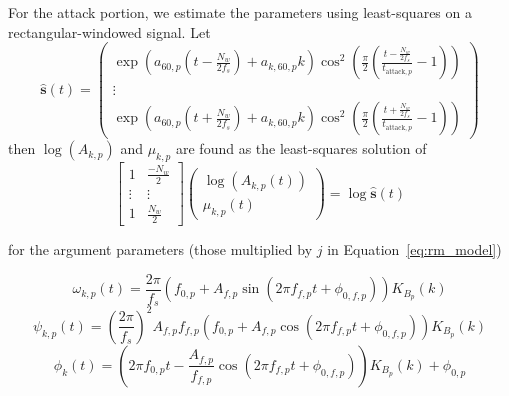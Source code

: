 For the attack portion, we estimate the parameters using least-squares on a
rectangular-windowed signal. Let
\begin{equation}
    \hat{\mathbf{s}}(t) =
    \begin{pmatrix}
        \exp \left(\displaystyle a_{60,p} \left( t - \frac{N_{w}}{2f_{s}} \right)  +
        a_{k,60,p} k \right) \cos^{2} \left(\displaystyle \frac{\pi}{2} \left(
                \frac{ t
        - \frac{N_{w}}{2f_{s}} }{ t_{\text{attack},p}} - 1 \right) \right)  \\
        \vdots \\
        \exp \left(\displaystyle a_{60,p} \left( t + \frac{N_{w}}{2f_{s}} \right)  +
        a_{k,60,p} k \right) \cos^{2} \left(\displaystyle \frac{\pi}{2} \left(
                \frac{ t
        + \frac{N_{w}}{2f_{s}}  }{ t_{\text{attack},p}} - 1 \right) \right)
    \end{pmatrix}
\end{equation}
then $\log(A_{k,p})$ and $\mu_{k,p}$ are found as the least-squares solution of
\begin{equation}
    \begin{bmatrix}
        1 & \frac{-N_{w}}{2} \\
        \vdots & \vdots \\
        1 & \frac{N_{w}}{2}
    \end{bmatrix}
    \begin{pmatrix}
        \log(A_{k,p}(t)) \\
        \mu_{k,p}(t)
    \end{pmatrix}
    = \log{\hat{\mathbf{s}}(t)}
\end{equation}

for the argument parameters (those multiplied by $j$ in Equation~\eqref{eq:rm_model})

\begin{equation}
    \omega_{k,p} \left( t \right)  = \frac{2 \pi}{f_{s}}  \left(  f_{0,p} +
    A_{f,p} \sin \left( 2 \pi f_{f,p} t + \phi_{0,f,p} \right)  \right)
    K_{B_{p}} \left( k \right) 
\end{equation}
\begin{equation}
    \psi_{k,p} \left( t \right)  =  \left( \frac{2 \pi}{f_{s}} \right) ^{2}
    A_{f,p} f_{f,p}  \left(  f_{0,p} + A_{f,p} \cos \left( 2 \pi f_{f,p} t +
    \phi_{0,f,p} \right)  \right)  K_{B_{p}} \left( k \right) 
\end{equation}
\begin{equation}
    \phi_{k} \left( t \right)  =  \left( 2\pi f_{0,p}t - \frac{A_{f,p}}{f_{f,p}}
    \cos \left( 2\pi f_{f,p} t + \phi_{0,f,p} \right)  \right)  K_{B_{p}} \left(
    k \right)  + \phi_{0,p}
\end{equation}

